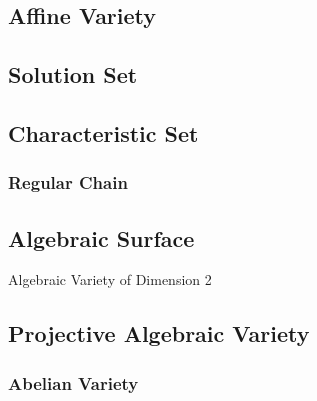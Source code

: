 \subsection{Affine Variety}\label{sec:affine_variety}

\subsection{Solution Set}\label{sec:solution_set}

\subsection{Characteristic Set}\label{sec:characteristic_set}

\subsubsection{Regular Chain}\label{sec:regular_chain}



\subsection{Algebraic Surface}\label{sec:algebraic_surface}

Algebraic Variety of Dimension 2



\subsection{Projective Algebraic Variety}
\label{sec:projective_algebraic_variety}

\subsubsection{Abelian Variety}\label{sec:abelian_variety}

